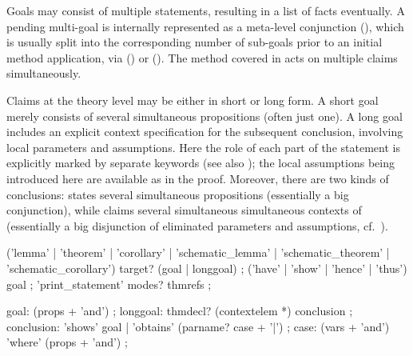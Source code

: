\begin{isabellebody}
\begin{isamarkuptext}
  Goals may consist of multiple statements, resulting in a list of
  facts eventually.  A pending multi-goal is internally represented as
  a meta-level conjunction (\isa{{\isachardoublequote}{\isacharampersand}{\isacharampersand}{\isacharampersand}{\isachardoublequote}}), which is usually
  split into the corresponding number of sub-goals prior to an initial
  method application, via \hyperlink{command.proof}{\mbox{}}
  () or \hyperlink{command.apply}{\mbox{}}
  ().  The \hyperlink{method.induct}{\mbox{}} method
  covered in  acts on multiple claims
  simultaneously.

  Claims at the theory level may be either in short or long form.  A
  short goal merely consists of several simultaneous propositions
  (often just one).  A long goal includes an explicit context
  specification for the subsequent conclusion, involving local
  parameters and assumptions.  Here the role of each part of the
  statement is explicitly marked by separate keywords (see also
  ); the local assumptions being introduced here
  are available as \hyperlink{fact.assms}{\mbox{}} in the proof.  Moreover, there
  are two kinds of conclusions: \hypertarget{element.shows}{\hyperlink{element.shows}{\mbox{}}} states several
  simultaneous propositions (essentially a big conjunction), while
  \hypertarget{element.obtains}{\hyperlink{element.obtains}{\mbox{}}} claims several simultaneous simultaneous
  contexts of (essentially a big disjunction of eliminated parameters
  and assumptions, cf.\ ).

  \begin{rail}
    ('lemma' | 'theorem' | 'corollary' |
     'schematic_lemma' | 'schematic_theorem' | 'schematic_corollary') target? (goal | longgoal)
    ;
    ('have' | 'show' | 'hence' | 'thus') goal
    ;
    'print_statement' modes? thmrefs
    ;
  
    goal: (props + 'and')
    ;
    longgoal: thmdecl? (contextelem *) conclusion
    ;
    conclusion: 'shows' goal | 'obtains' (parname? case + '|')
    ;
    case: (vars + 'and') 'where' (props + 'and')
    ;
  \end{rail}


\end{isamarkuptext}
\end{isabellebody}
